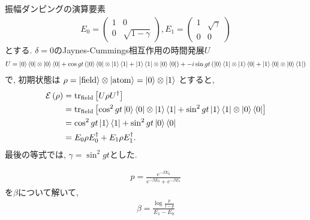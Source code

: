 \begin{ex}
    \label{ex8.24}
    振幅ダンピングの演算要素
    \begin{align*}
        E_0 =
        \begin{pmatrix}
            1 & 0                \\
            0 & \sqrt{1- \gamma}
        \end{pmatrix}
        ,
        E_1 =
        \begin{pmatrix}
            1 & \sqrt{\gamma} \\
            0 & 0
        \end{pmatrix}
    \end{align*}
    とする.
    $\delta = 0$のJaynes-Cummings相互作用の時間発展$U$
    \begin{align*}
        U =
        \ket{0}\bra{0} \otimes \ket{0} \bra{0}
        +
        \cos gt \left(
        \ket{0}\bra{0} \otimes \ket{1} \bra{1} + \ket{1}\bra{1} \otimes \ket{0} \bra{0}
        \right)
        +
        -i \sin gt \left(
        \ket{0}\bra{1} \otimes \ket{1} \bra{0} + \ket{1}\bra{0} \otimes \ket{0} \bra{1}
        \right)
    \end{align*}
    で, 初期状態は $ \rho = \ket{ \mathrm{field}} \otimes \ket{\mathrm{atom}} = \ket{0} \otimes \ket{1}$
    とすると,
    \begin{align*}
        \mathcal{E} \left( \rho\right)
         & =
        \mathrm{tr}_\mathrm{field} \left[ U \rho U^\dagger \right]   \\
         & =
        \mathrm{tr}_\mathrm{field} \left[
            \cos^2 gt  \ket{0}\bra{0} \otimes \ket{1} \bra{1}
            +
            \sin^2 gt  \ket{1}\bra{1} \otimes \ket{0} \bra{0}
        \right]                                              \\
         & =
        \cos^2 gt \ket{1}\bra{1} + \sin^2 gt \ket{0} \bra{0} \\
         & =E_0 \rho E_0^\dagger + E_1 \rho E_1^\dagger.
    \end{align*}
    最後の等式では, $\gamma = \sin^2 gt$とした.
\end{ex}

\begin{ex}
    \label{ex8.25}
    \begin{align*}
        p = \frac{e^{- \beta E_0}}{e^{- \beta E_0} + e^{- \beta E_1}}
    \end{align*}
    を$\beta$について解いて,
    \begin{align*}
        \beta = \frac{\log\frac{p}{1-p}}{E_1 - E_0}
    \end{align*}
\end{ex}

